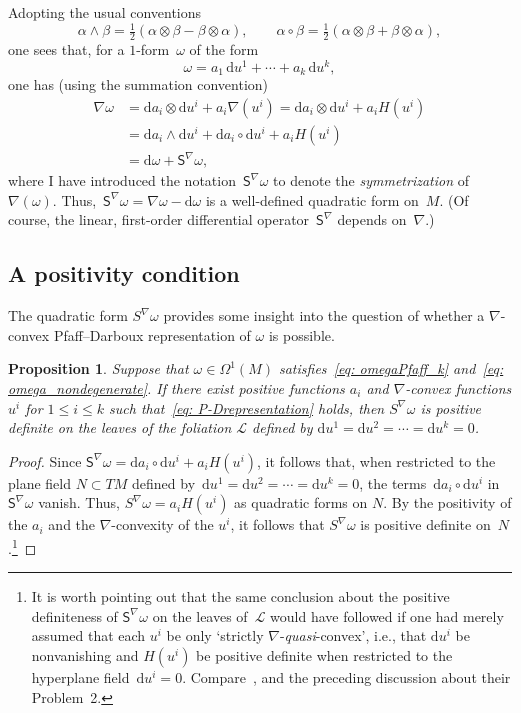 \documentclass[pdftex]{sigma}
\renewcommand{\d}{\mathrm{d}}%
\newcommand{\cL}{{\mathcal L}}
\newcommand{\Ss}{\mathsf{S}}
\newcommand{\w}{\wedge}
\numberwithin{equation}{section}
\newtheorem{Proposition}[Theorem]{Proposition}
 { \theoremstyle{definition}
\newtheorem{Definition}[Theorem]{Definition}
\newtheorem{Note}[Theorem]{Note}
\newtheorem{Example}[Theorem]{Example}
\newtheorem{Remark}[Theorem]{Remark} }
\begin{document}
Adopting the usual conventions
\begin{equation*}%
\alpha\w\beta
= \tfrac12(\alpha\otimes\beta-\beta\otimes\alpha), \qquad
\alpha\circ\beta
= \tfrac12(\alpha\otimes\beta+\beta\otimes\alpha),
\end{equation*}
one sees that, for a $1$-form~$\omega$ of the form
\begin{equation}\label{eq: P-Drepresentation}
\omega = a_1\,\d u^1 + \cdots + a_k\,\d u^k,
\end{equation}
one has (using the summation convention)
\begin{align*}
\nabla\omega
&= \d a_i\otimes\d u^i + a_i \nabla(u^i) = \d a_i\otimes\d u^i + a_i H(u^i)\\
&= \d a_i\w\d u^i + \d a_i\circ\d u^i + a_i H(u^i)\\
&= \d\omega + \Ss^\nabla\omega,
\end{align*}
where I have introduced
the notation~$\Ss^\nabla\omega$ to denote the {\it symmetrization\/}
of~$\nabla(\omega)$. Thus,~$\Ss^\nabla\omega
= \nabla\omega- \d\omega$
is a well-defined quadratic form on~$M$.
(Of course, the linear, first-order differential operator~$\Ss^\nabla$
depends on~$\nabla$.)


\subsection{A positivity condition}\label{ssec: poscond}
The quadratic form $S^\nabla\omega$ provides some insight
into the question of whether a $\nabla$-convex Pfaff--Darboux
representation of $\omega$ is possible.

\begin{Proposition}\label{prop: ness cond}
Suppose that $\omega\in\Omega^1(M)$ satisfies~\eqref{eq: omegaPfaff_k}
and~\eqref{eq: omega_nondegenerate}. If there exist positive
functions $a_i$ and $\nabla$-convex functions $u^i$ for $1\le i\le k$
such that~\eqref{eq: P-Drepresentation} holds, then $S^\nabla\omega$
is positive definite on the leaves of the foliation $\cL$ defined by
$\d u^1 = \d u^2 = \cdots = \d u^k = 0$.
\end{Proposition}

\begin{proof}
Since $\Ss^\nabla\omega =\d a_i\circ \d u^i + a_i H(u^i)$,
it follows that, when restricted to the plane field ${N\subset TM}$
defined by~$\d u^1 = \d u^2 = \cdots = \d u^k = 0$,
the terms~$\d a_i\circ \d u^i$ in~$\Ss^\nabla\omega$
vanish. Thus, $S^\nabla\omega = a_i H(u^i)$
as quadratic forms on $N$. By the positivity of the $a_i$
and the $\nabla$-convexity of the $u^i$, it follows that
$S^\nabla\omega$ is positive definite on~$N$.\footnote{It is worth pointing out that the same conclusion
about the positive definiteness of $\Ss^\nabla\omega$ on the leaves of~$\cL$
would have followed if one had merely assumed that each $u^i$
be only `strictly $\nabla$-\emph{quasi}-convex',
i.e., that $\d u^i$ be nonvanishing and $H(u^i)$ be positive definite
when restricted to the hyperplane field~$\d u^i = 0$.
Compare~\cite[Lemma~1]{MR2023129},
and the preceding discussion about their Problem~2.}
\end{proof}
\end{document}
